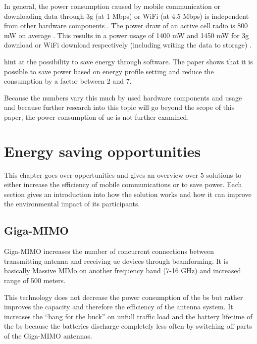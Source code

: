 \documentclass[11pt,a4paper]{article}
\begin{document}
In general, the power consumption caused by mobile communication or downloading data through \acrshort{3g} (at 1 Mbps) or WiFi (at 4.5 Mbps) is independent from other hardware components \citep{smartphoneEnergySurvey}.
The power draw of an active cell radio is 800 mW on average \citep{smartphoneEnergyConsumption}.
This results in a power usage of 1400 mW and 1450 mW for \acrshort{3g} download or WiFi download respectively (including writing the data to storage) \citep{smartphoneEnergySurvey}.

\cite{profilingMobilePower} hint at the possibility to save energy through software.
The paper shows that it is possible to save power based on energy profile setting and reduce the consumption by a factor between 2 and 7.

Because the numbers vary this much by used hardware components and usage and because further research into this topic will go beyond the scope of this paper, the power consumption of \acrlong{ue} is not further examined.

\section{Energy saving opportunities}\label{sec:opportunities}
This chapter goes over oppertunities and gives an overview over 5 solutions to either increase the efficiency of mobile communications or to save power.
Each section gives an introduction into how the solution works and how it can improve the environmental impact of its participants.

\subsection{Giga-MIMO}\label{subsec:gigamimo}
Giga-MIMO increases the number of concurrent connections between transmitting antenna and receiving \acrlong{ue} devices through beamforming.
It is basically Massive MIMo on another frequency band (7-16 GHz) and increased range of 500 meters. %

This technology does not decrease the power consumption of the \acrlong{bs} but rather improves the capacity and therefore the efficiency of the antenna system.
It increases the \enquote{bang for the buck} on unfull traffic load and the battery lifetime of the \acrshort{bs} because the batteries discharge completely less often by switching off parts of the Giga-MIMO antennas.
\end{document}
